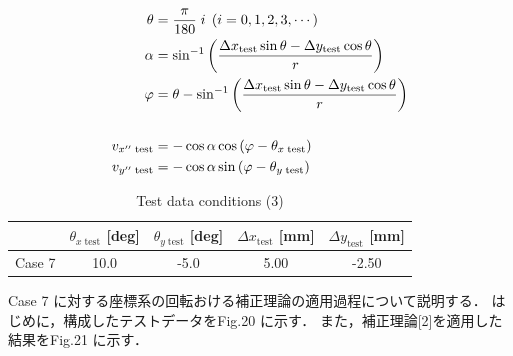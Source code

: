 \begin{align}
  \theta                  & = \frac{\pi}{180} \; i \;\left(i = 0, 1, 2, 3, \cdots\right)                                                       \\
  \alpha                  & = \sin^{-1} \left( \frac{\Delta x_\mathrm{test} \sin \theta - \Delta y_\mathrm{test} \cos \theta}{r} \right)       \\
  \varphi                 & = \theta - \sin^{-1}\left(\frac{\Delta x_\mathrm{test} \sin \theta - \Delta y_\mathrm{test} \cos \theta}{r}\right) \\
  \notag                                                                                                                                       \\
  v_{x'' \;\mathrm{test}} & = - \cos \alpha \cos \left(\varphi - \theta_{x\; \mathrm{test}} \right)                                            \\
  v_{y'' \;\mathrm{test}} & = - \cos \alpha \sin \left(\varphi - \theta_{y\; \mathrm{test}}\right)
\end{align}

\begin{table}[htbp]
  \begin{center}
    \caption{Test data conditions (3)}
    \begin{tabular}{|p{30mm}|p{20mm}|p{20mm}|p{20mm}|p{20mm}|}
      \hline
      \multicolumn{1}{|c|}{}       & \multicolumn{1}{|c|}{$\theta_{x\;\mathrm{test}}$ [deg]} & \multicolumn{1}{|c|}{$\theta_{y\;\mathrm{test}}$ [deg]} & \multicolumn{1}{|c|}{$\Delta x_\mathrm{test}$ [mm]} & \multicolumn{1}{|c|}{$\Delta y_\mathrm{test}$ [mm]} \\ \hline
      \multicolumn{1}{|c|}{Case 7} & \multicolumn{1}{|c|}{10.0}                              & \multicolumn{1}{|c|}{-5.0}                              & \multicolumn{1}{|c|}{5.00}                          & \multicolumn{1}{|c|}{-2.50}                         \\ \hline
    \end{tabular}
  \end{center}
\end{table}

\newpage

Case 7 に対する座標系の回転おける補正理論の適用過程について説明する．
はじめに，構成したテストデータをFig.20 に示す．
また，補正理論[2]を適用した結果をFig.21 に示す．

